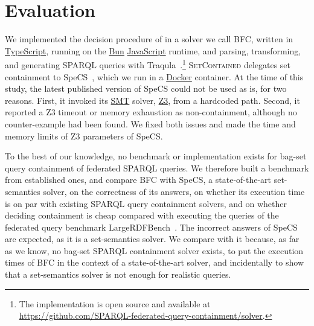 \section{Evaluation}
We implemented the decision procedure of  in a solver we call \acf{BFC}, written in \href{https://www.typescriptlang.org/}{TypeScript}, running on the \href{https://bun.sh/}{Bun} \href{https://developer.mozilla.org/en-US/docs/Web/JavaScript}{JavaScript} runtime, and parsing, transforming, and generating SPARQL queries with Traqula~\cite{De_Smet_Traqula_Providing_a_2026}.\footnote{The implementation is open source and available at \url{https://github.com/SPARQL-federated-query-containment/solver}.}
\textsc{SetContained} delegates set containment to SpeCS~\cite{Spasic2023}, which we run in a \href{https://www.docker.com/}{Docker} container.
At the time of this study, the latest published version of SpeCS could not be used as is, for two reasons.
First, it invoked its \href{https://smt-lib.org/}{SMT} solver, \href{https://www.microsoft.com/en-us/research/project/z3-3/}{Z3}, from a hardcoded path.
Second, it reported a Z3 timeout or memory exhaustion as non-containment, although no counter-example had been found.
We fixed both issues and made the time and memory limits of Z3 parameters of SpeCS.

To the best of our knowledge, no benchmark or implementation exists for bag-set query containment of federated SPARQL queries.
We therefore built a benchmark from established ones, and compare \ac{BFC} with SpeCS, a state-of-the-art set-semantics solver, on the correctness of its answers, on whether its execution time is on par with existing SPARQL query containment solvers, and on whether deciding containment is cheap compared with executing the queries of the federated query benchmark LargeRDFBench~\cite{saleem2018largerdfbench}.
The incorrect answers of SpeCS are expected, as it is a set-semantics solver.
We compare with it because, as far as we know, no bag-set SPARQL containment solver exists, to put the execution times of \ac{BFC} in the context of a state-of-the-art solver, and incidentally to show that a set-semantics solver is not enough for realistic queries.

